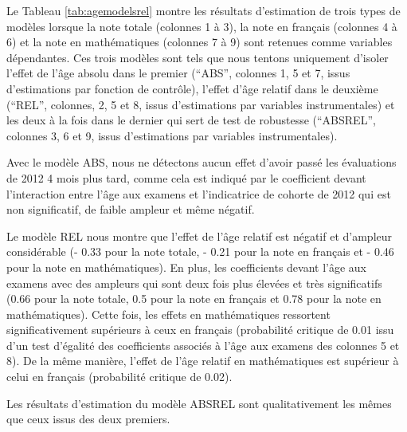 \documentclass[
]{book}
\begin{document}
\quad Le Tableau \ref{tab:agemodelsrel} montre les résultats d'estimation de trois types de modèles lorsque la note totale (colonnes 1 à 3), la note en français (colonnes 4 à 6) et la note en mathématiques (colonnes 7 à 9) sont retenues comme variables dépendantes. Ces trois modèles sont tels que nous tentons uniquement d'isoler l'effet de l'âge absolu dans le premier (``ABS'', colonnes 1, 5 et 7, issus d'estimations par fonction de contrôle), l'effet d'âge relatif dans le deuxième (``REL'', colonnes, 2, 5 et 8, issus d'estimations par variables instrumentales) et les deux à la fois dans le dernier qui sert de test de robustesse (``ABSREL'', colonnes 3, 6 et 9, issus d'estimations par variables instrumentales).

Avec le modèle ABS, nous ne détectons aucun effet d'avoir passé les évaluations de 2012 4 mois plus tard, comme cela est indiqué par le coefficient devant l'interaction entre l'âge aux examens et l'indicatrice de cohorte de 2012 qui est non significatif, de faible ampleur et même négatif.

Le modèle REL nous montre que l'effet de l'âge relatif est négatif et d'ampleur considérable (- 0.33 pour la note totale, - 0.21 pour la note en français et - 0.46 pour la note en mathématiques). En plus, les coefficients devant l'âge aux examens avec des ampleurs qui sont deux fois plus élevées et très significatifs (0.66 pour la note totale, 0.5 pour la note en français et 0.78 pour la note en mathématiques). Cette fois, les effets en mathématiques ressortent significativement supérieurs à ceux en français (probabilité critique de 0.01 issu d'un test d'égalité des coefficients associés à l'âge aux examens des colonnes 5 et 8). De la même manière, l'effet de l'âge relatif en mathématiques est supérieur à celui en français (probabilité critique de 0.02).

Les résultats d'estimation du modèle ABSREL sont qualitativement les mêmes que ceux issus des deux premiers.
\end{document}
